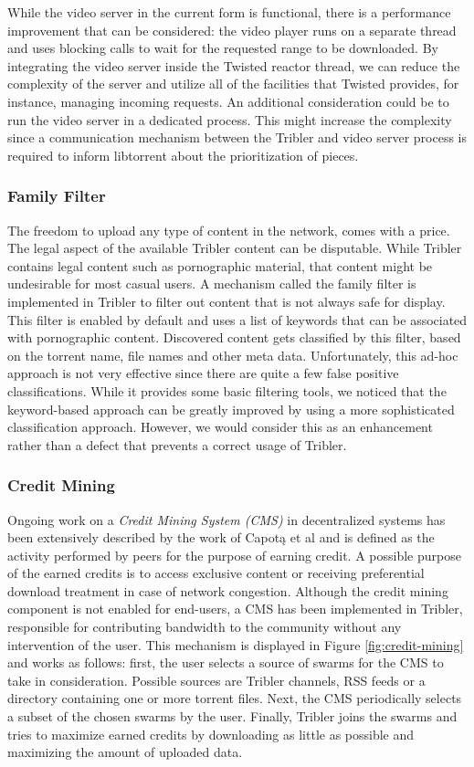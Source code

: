 While the video server in the current form is functional, there is a performance improvement that can be considered: the video player runs on a separate thread and uses blocking calls to wait for the requested range to be downloaded. By integrating the video server inside the Twisted reactor thread, we can reduce the complexity of the server and utilize all of the facilities that Twisted provides, for instance, managing incoming requests. An additional consideration could be to run the video server in a dedicated process. This might increase the complexity since a communication mechanism between the Tribler and video server process is required to inform libtorrent about the prioritization of pieces.

\subsubsection{\textbf{Family Filter}}
The freedom to upload any type of content in the network, comes with a price. The legal aspect of the available Tribler content can be disputable. While Tribler  contains legal content such as pornographic material, that content might be undesirable for most casual users. A mechanism called the family filter is  implemented in Tribler to filter out content that is not always safe for display. This filter is enabled by default and uses a list of keywords that can be associated with pornographic content. Discovered content gets classified by this filter, based on the torrent name, file names and other meta data. Unfortunately, this ad-hoc approach is not very effective since there are quite a few false positive classifications. While it provides some basic filtering tools, we noticed that the keyword-based approach can be greatly improved by using a more sophisticated classification approach. However, we would consider this as an enhancement rather than a defect that prevents a correct usage of Tribler.

\subsubsection{\textbf{Credit Mining}}
Ongoing work on a \emph{Credit Mining System (CMS)} in decentralized systems has been extensively described by the work of Capot\k{a} et al\cite{capotka2015decentralized} and is defined as the activity performed by peers for the purpose of earning credit. A possible purpose of the earned credits is to access exclusive content or receiving preferential download treatment in case of network congestion. Although the credit mining component is not enabled for end-users, a CMS has been implemented in Tribler, responsible for contributing bandwidth to the community without any intervention of the user. This mechanism is displayed in Figure \ref{fig:credit-mining} and works as follows: first, the user selects a source of swarms for the CMS to take in consideration. Possible sources are Tribler channels, RSS feeds or a directory containing one or more torrent files. Next, the CMS periodically selects a subset of the chosen swarms by the user. Finally, Tribler joins the swarms and tries to maximize earned credits by downloading as little as possible and maximizing the amount of uploaded data.\\

